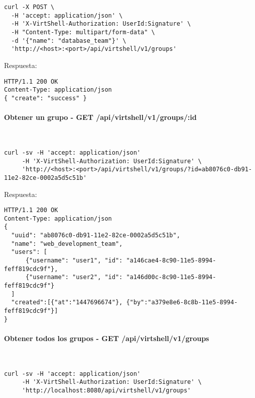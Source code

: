 \begin{lstlisting}[style=json]
curl -X POST \
  -H 'accept: application/json' \
  -H 'X-VirtShell-Authorization: UserId:Signature' \
  -H "Content-Type: multipart/form-data" \
  -d '{"name": "database_team"}' \
  'http://<host>:<port>/api/virtshell/v1/groups'
\end{lstlisting}

\vspace{1cm}
Respuesta:
\vspace{1cm}

\begin{lstlisting}[style=json]
HTTP/1.1 200 OK
Content-Type: application/json
{ "create": "success" }
\end{lstlisting}

\paragraph{Obtener un grupo - GET /api/virtshell/v1/groups/:id} ~\\

\begin{lstlisting}[style=json]
curl -sv -H 'accept: application/json' 
     -H 'X-VirtShell-Authorization: UserId:Signature' \ 
     'http://<host>:<port>/api/virtshell/v1/groups/?id=ab8076c0-db91-11e2-82ce-0002a5d5c51b'
\end{lstlisting}

\vspace{1cm}
Respuesta:
\vspace{1cm}

\begin{lstlisting}[style=json]
HTTP/1.1 200 OK
Content-Type: application/json
{
  "uuid": "ab8076c0-db91-11e2-82ce-0002a5d5c51b",
  "name": "web_development_team",
  "users": [ 
      {"username": "user1", "id": "a146cae4-8c90-11e5-8994-feff819cdc9f"},
      {"username": "user2", "id": "a146d00c-8c90-11e5-8994-feff819cdc9f"}
  ]
  "created":[{"at":"1447696674"}, {"by":"a379e8e6-8c8b-11e5-8994-feff819cdc9f"}]
}
\end{lstlisting}

\paragraph{Obtener todos los grupos - GET /api/virtshell/v1/groups} ~\\

\begin{lstlisting}[style=json]
curl -sv -H 'accept: application/json' 
     -H 'X-VirtShell-Authorization: UserId:Signature' \ 
     'http://localhost:8080/api/virtshell/v1/groups'
\end{lstlisting}

